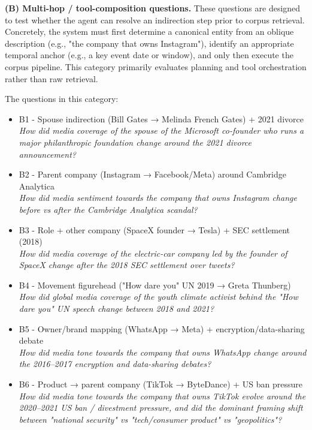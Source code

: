 \textbf{(B) Multi-hop / tool-composition questions.}
These questions are designed to test whether the agent can resolve an indirection step prior to corpus retrieval. Concretely, the system must first determine a canonical entity from an oblique description (e.g., "the company that owns Instagram"), identify an appropriate temporal anchor (e.g., a key event date or window), and only then execute the corpus pipeline. This category primarily evaluates planning and tool orchestration rather than raw retrieval.

The questions in this category:
\begin{itemize}
    \item B1 - Spouse indirection (Bill Gates → Melinda French Gates) + 2021 divorce \\ \textit{How did media coverage of the spouse of the Microsoft co-founder who runs a major philanthropic foundation change around the 2021 divorce announcement?}
    \item B2 - Parent company (Instagram → Facebook/Meta) around Cambridge Analytica \\ \textit{How did media sentiment towards the company that owns Instagram change before vs after the Cambridge Analytica scandal?}
    \item B3 - Role + other company (SpaceX founder → Tesla) + SEC settlement (2018) \\ \textit{How did media coverage of the electric-car company led by the founder of SpaceX change after the 2018 SEC settlement over tweets?}
    \item B4 - Movement figurehead ("How dare you" UN 2019 → Greta Thunberg) \\ \textit{How did global media coverage of the youth climate activist behind the "How dare you" UN speech change between 2018 and 2021?}
    \item B5 - Owner/brand mapping (WhatsApp → Meta) + encryption/data-sharing debate \\ \textit{How did media tone towards the company that owns WhatsApp change around the 2016–2017 encryption and data-sharing debates?}
    \item B6 - Product → parent company (TikTok → ByteDance) + US ban pressure \\ \textit{How did media tone towards the company that owns TikTok evolve around the 2020–2021 US ban / divestment pressure, and did the dominant framing shift between "national security" vs "tech/consumer product" vs "geopolitics"?}
\end{itemize}

